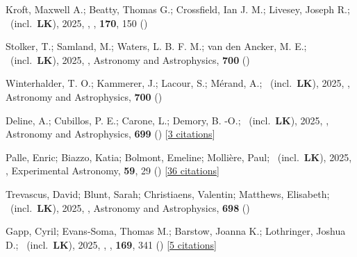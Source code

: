 \item[{\color{numcolor}\scriptsize143}] Kroft, Maxwell A.; Beatty, Thomas G.; Crossfield, Ian J. M.; Livesey, Joseph R.; \etal\ (incl.\ \textbf{LK}), 2025, , \aj, \textbf{170}, 150 ()

\item[{\color{numcolor}\scriptsize142}] Stolker, T.; Samland, M.; Waters, L. B. F. M.; van den Ancker, M. E.; \etal\ (incl.\ \textbf{LK}), 2025, , Astronomy and Astrophysics, \textbf{700} ()

\item[{\color{numcolor}\scriptsize141}] Winterhalder, T. O.; Kammerer, J.; Lacour, S.; M{\'e}rand, A.; \etal\ (incl.\ \textbf{LK}), 2025, , Astronomy and Astrophysics, \textbf{700} ()

\item[{\color{numcolor}\scriptsize140}] Deline, A.; Cubillos, P. E.; Carone, L.; Demory, B. -O.; \etal\ (incl.\ \textbf{LK}), 2025, , Astronomy and Astrophysics, \textbf{699} () [\href{https://ui.adsabs.harvard.edu/abs/2025A&A...699A.150D}{3 citations}]

\item[{\color{numcolor}\scriptsize139}] Palle, Enric; Biazzo, Katia; Bolmont, Emeline; Molli{\`e}re, Paul; \etal\ (incl.\ \textbf{LK}), 2025, , Experimental Astronomy, \textbf{59}, 29 () [\href{https://ui.adsabs.harvard.edu/abs/2025ExA....59...29P}{36 citations}]

\item[{\color{numcolor}\scriptsize138}] Trevascus, David; Blunt, Sarah; Christiaens, Valentin; Matthews, Elisabeth; \etal\ (incl.\ \textbf{LK}), 2025, , Astronomy and Astrophysics, \textbf{698} ()

\item[{\color{numcolor}\scriptsize137}] Gapp, Cyril; Evans-Soma, Thomas M.; Barstow, Joanna K.; Lothringer, Joshua D.; \etal\ (incl.\ \textbf{LK}), 2025, , \aj, \textbf{169}, 341 () [\href{https://ui.adsabs.harvard.edu/abs/2025AJ....169..341G}{5 citations}]

